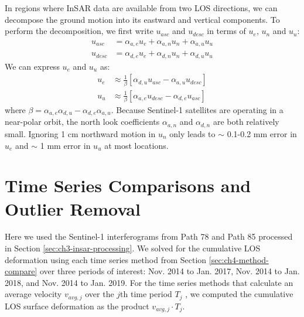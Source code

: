 In regions where InSAR data are available from two LOS directions, we can decompose the ground motion into its eastward and vertical components.
To perform the decomposition, we first write $u_{asc}$ and $u_{desc}$ in terms of $u_e$, $u_n$ and $u_u$:
\begin{align}
	u_{asc} &= \alpha_{a,e} u_{e} + \alpha_{a,n} u_{n} + \alpha_{a,u} u_{u}\\
	u_{desc} &= \alpha_{d,e} u_{e} + \alpha_{d,n} u_{n} + \alpha_{d,u} u_{u}
\end{align}
We can express $u_e$ and $u_u$ as:
\begin{align}
	u_{e} &\approx  \frac{1}{\beta}  \left[\alpha_{d,u}  u_{asc} - \alpha_{a,u} u_{desc} \right] \\
	u_{u} &\approx  \frac{1}{\beta}  \left[\alpha_{a,e} u_{desc} - \alpha_{d,e}  u_{asc}  \right] 
\end{align}
where  $ \beta = {\alpha_{a,e} \alpha_{d,u}- \alpha_{d,e} \alpha_{a,u}} $.
Because Sentinel-1 satellites are operating in a near-polar orbit, the north look coefficients $\alpha_{a,n}$ and $\alpha_{d,n}$ are both relatively small. Ignoring 1 cm northward motion in $u_n$ only leads to $\sim$ 0.1-0.2 mm error in $u_e$ and $\sim$ 1 mm error in $u_u$ at most locations.  



\section{Time Series Comparisons and Outlier Removal}
\label{sec:ch4-ts-compare-result}



Here we used the Sentinel-1 interferograms from Path 78 and Path 85 processed in Section \ref{sec:ch3-insar-processing}. 
We solved for the cumulative LOS deformation using each time series method from Section \ref{sec:ch4-method-compare} over three periods of interest: Nov. 2014 to Jan. 2017, Nov. 2014 to Jan. 2018, and Nov. 2014 to Jan. 2019. 
For the time series methods that calculate an average velocity $v_{avg,j}$ over the $j$th time period $T_j$ , we computed the cumulative LOS surface deformation as the product $v_{avg,j} \cdot T_j$.

